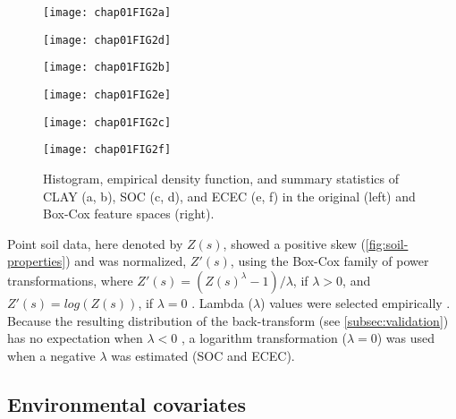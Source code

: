  \begin{figure}[!ht]
   \centering
    \begin{minipage}[b]{63mm}
      \subcaption{}
      \centering
      \texttt{[image: chap01FIG2a]}
    \end{minipage}
    \begin{minipage}[b]{63mm}
      \subcaption{}
      \centering
      \texttt{[image: chap01FIG2d]}
    \end{minipage}
    \begin{minipage}[b]{63mm}
      \subcaption{}
      \centering
      \texttt{[image: chap01FIG2b]}
    \end{minipage}
    \begin{minipage}[b]{63mm}
      \subcaption{}
      \centering
      \texttt{[image: chap01FIG2e]}
    \end{minipage}
    \begin{minipage}[b]{63mm}
      \subcaption{}
      \centering
      \texttt{[image: chap01FIG2c]}
    \end{minipage}
    \begin{minipage}[b]{63mm}
      \subcaption{}
      \centering
      \texttt{[image: chap01FIG2f]}
    \end{minipage}
  \caption{Histogram, empirical density function, and summary statistics of CLAY
  (a, b), SOC (c, d), and ECEC (e, f) in the original (left) and Box-Cox 
  feature spaces (right).}
  \label{fig:soil-properties}
 \end{figure}

Point soil data, here denoted by $Z(s)$, showed a positive skew 
(\autoref{fig:soil-properties}) and was normalized, $Z'(s)$, using the Box-Cox 
family of power transformations, where $Z'(s) = (Z(s)^{\lambda} - 1) / \lambda$,
if $\lambda > 0$, and $Z'(s) = log(Z(s))$, if $\lambda = 0$ 
\citep{DiggleEtAl2007}. Lambda ($\lambda$) values were selected empirically 
\citep{FoxEtAl2011}. Because the resulting distribution of the back-transform 
(see \autoref{subsec:validation}) has no expectation when $\lambda<0$ 
\citep{RibeiroEtAl2001}, a logarithm transformation ($\lambda=0$) was used when 
a negative $\lambda$ was estimated (SOC and ECEC).

\subsection{Environmental covariates}
\label{subsec:sources}

